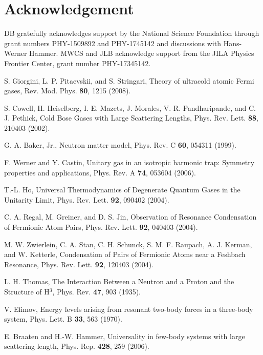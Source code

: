 \documentclass[aps,pra,twocolumn,showpacs,superscriptaddress]{revtex4}
\begin{document}
\section{Acknowledgement}
\label{acknowledgement}
DB gratefully
acknowledges support by the National Science Foundation through
grant numbers
PHY-1509892 and PHY-1745142
and discussions with Hans-Werner Hammer.
MWCS and JLB acknowledge support from the 
JILA Physics Frontier Center, grant number PHY-17345142.


\begin{thebibliography}{100}

  S. Giorgini, L. P. Pitaevskii, and S. Stringari,
  Theory of ultracold atomic Fermi gases,
  Rev. Mod. Phys. {\bf{80}}, 1215 (2008).


  S. Cowell, H. Heiselberg, I. E. Mazets, J. Morales,
  V. R. Pandharipande, and C. J. Pethick,
  Cold Bose Gases with Large Scattering Lengths,
  Phys. Rev. Lett. {\bf{88}}, 210403 (2002).

G. A. Baker, Jr.,
  Neutron matter model,
Phys. Rev. C {\bf{60}}, 054311 (1999).


F. Werner and Y. Castin,
Unitary gas in an isotropic harmonic trap: Symmetry properties and applications,
Phys. Rev. A {\bf{74}}, 053604 (2006).

T.-L. Ho,
  Universal Thermodynamics of Degenerate Quantum Gases in the Unitarity Limit,
Phys. Rev. Lett. {\bf{92}}, 090402 (2004). 

C. A. Regal, M. Greiner, and D. S. Jin,
Observation of Resonance Condensation of Fermionic Atom Pairs,
Phys. Rev. Lett. {\bf{92}}, 040403 (2004).

M. W. Zwierlein, C. A. Stan, C. H. Schunck, S. M. F. Raupach,
A. J. Kerman, and W. Ketterle,
Condensation of Pairs of Fermionic Atoms near a Feshbach Resonance,
Phys. Rev. Lett. {\bf{92}}, 120403 (2004).


  L. H. Thomas,
  The Interaction Between a Neutron and a Proton and the Structure of 
H$^{3}$,
Phys. Rev. {\bf{47}}, 903 (1935).

V. Efimov,
Energy levels
  arising from resonant two-body forces in a three-body system,
Phys. Lett. B {\bf{33}}, 563 (1970).

E. Braaten and H.-W. Hammer,
Universality
  in few-body systems with large scattering length,
Phys. Rep. {\bf{428}}, 259 (2006).


\end{thebibliography}
\end{document}
